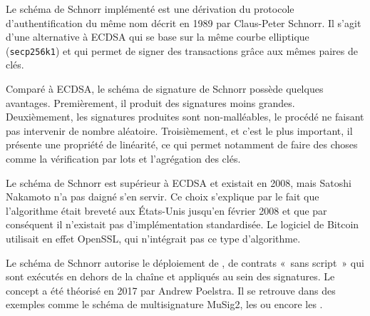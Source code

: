 Le schéma de Schnorr implémenté est une dérivation du protocole d'authentification du même nom décrit en 1989 par Claus-Peter Schnorr. Il s'agit d'une alternative à ECDSA qui se base sur la même courbe elliptique (\texttt{secp256k1}) et qui permet de signer des transactions grâce aux mêmes paires de clés.

Comparé à ECDSA, le schéma de signature de Schnorr possède quelques avantages. Premièrement, il produit des signatures moins grandes. Deuxièmement, les signatures produites sont non-malléables, le procédé ne faisant pas intervenir de nombre aléatoire. Troisièmement, et c'est le plus important, il présente une propriété de linéarité, ce qui permet notamment de faire des choses comme la vérification par lots et l'agrégation des clés. 

Le schéma de Schnorr est supérieur à ECDSA et existait en 2008, mais Satoshi Nakamoto n'a pas daigné s'en servir. Ce choix s'explique par le fait que l'algorithme était breveté aux États-Unis jusqu'en février 2008 et que par conséquent il n'existait pas d'implémentation standardisée. Le logiciel de Bitcoin utilisait en effet OpenSSL, qui n'intégrait pas ce type d'algorithme.

Le schéma de Schnorr autorise le déploiement de , de contrats «~sans script~» qui sont exécutés en dehors de la chaîne et appliqués au sein des signatures. Le concept a été théorisé en 2017 par Andrew Poelstra. Il se retrouve dans des exemples comme le schéma de multisignature MuSig2, les  ou encore les .

